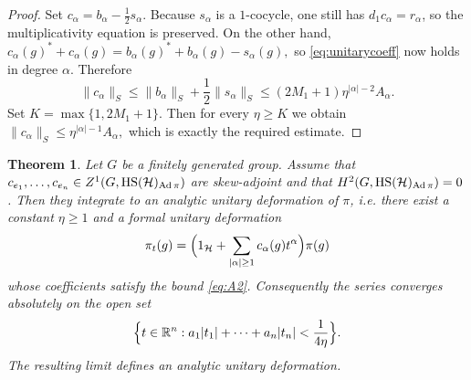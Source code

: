 \documentclass[12pt]{amsproc}
\theoremstyle{plain}
\newtheorem{theorem}{Theorem}[section]
\theoremstyle{definition}
\numberwithin{equation}{section}
\newcommand{\HS}{{\rm HS}}
\DeclareMathOperator{\Ad}{Ad}
\begin{document}
\begin{proof}
Set
$
c_\alpha=b_\alpha-\frac12 s_\alpha.
$
Because $s_\alpha$ is a $1$-cocycle, one still has $d_1c_\alpha=r_\alpha$, so the multiplicativity equation is preserved. On the other hand,
$
c_\alpha(g)^*+c_\alpha(g)=b_\alpha(g)^*+b_\alpha(g)-s_\alpha(g),
$
so \eqref{eq:unitarycoeff} now holds in degree $\alpha$. Therefore
\[
\|c_\alpha\|_S\le \|b_\alpha\|_S+\frac12\|s_\alpha\|_S\le (2M_1+1)\eta^{|\alpha|-2}A_\alpha.
\]
Set
$
K=\max\{1,2M_1+1\}.
$
Then for every $\eta\ge K$ we obtain
$
\|c_\alpha\|_S\le \eta^{|\alpha|-1}A_\alpha,
$
which is exactly the required estimate.
\end{proof}

\begin{theorem}\label{thm:unitaryanalytic} Let $G$ be a finitely generated group.
Assume that $c_{e_1},\dots,c_{e_n}\in Z^1(G,\HS(\mathcal H)_{\Ad\pi})$ are skew-adjoint and that $H^2(G,\HS(\mathcal H)_{\Ad\pi})=0$. Then they integrate to an analytic unitary deformation of $\pi$, i.e. there exist a constant $\eta\ge 1$ and a formal unitary deformation
\[
\pi_t(g)=\Bigl(1_{\mathcal H}+\sum_{|\alpha|\ge 1}c_\alpha(g)t^\alpha\Bigr)\pi(g)
\]
whose coefficients satisfy the bound \eqref{eq:A2}. Consequently the series converges absolutely on the open set
\[
\Bigl\{t\in {\mathbb R}^n: a_1|t_1|+\cdots+a_n|t_n|<\frac1{4\eta}\Bigr\}.
\]
The resulting limit defines an analytic unitary deformation.
\end{theorem}
\end{document}

